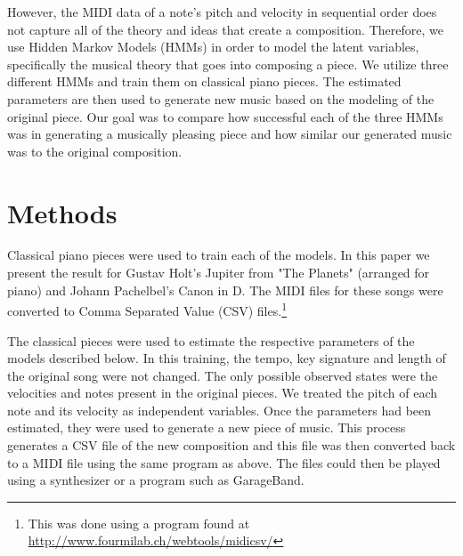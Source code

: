 \documentclass{article} %
\begin{document}
However, the MIDI data of a note's pitch and velocity in sequential order does not capture all of the theory and ideas that create a composition. Therefore, we use Hidden Markov Models (HMMs) in order to model the latent variables, specifically the musical theory that goes into composing a piece. We utilize three different HMMs and train them on classical piano pieces. The estimated parameters are then used to generate new music based on the modeling of the original piece.  Our goal was to compare how successful each of the three HMMs was in generating a musically pleasing piece and how similar our generated music was to the original composition.

\section{Methods}

Classical piano pieces were used to train each of the models. In this paper we present the result for Gustav Holt's Jupiter from "The Planets" (arranged for piano) and Johann Pachelbel's Canon in D. The MIDI files for these songs were converted to Comma Separated Value (CSV) files.\footnote{This was done using a program found at \url{http://www.fourmilab.ch/webtools/midicsv/}} 

The classical pieces were used to estimate the respective parameters of the models described below. In this training, the tempo, key signature and length of the original song were not changed. The only possible observed states were the velocities and notes present in the original pieces. We treated the pitch of each note and its velocity as independent variables.  Once the parameters had been estimated, they were used to generate a new piece of music. This process generates a CSV file of the new composition and this file was then converted back to a MIDI file using the same program as above. The files could then be played using a synthesizer or a program such as GarageBand.
\end{document}
